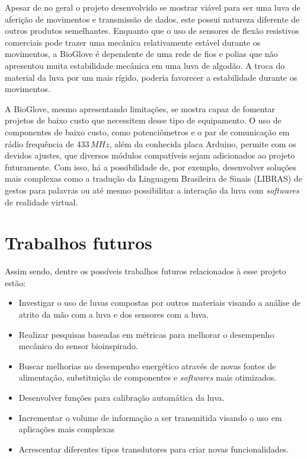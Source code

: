 \documentclass[
	12pt,				%
	openright,			%
	oneside,			%
	a4paper,			%
	english,			%
	brazil				%
	]{abntex2}
\begin{document}
		Apesar de no geral o projeto desenvolvido se mostrar viável para ser uma luva de aferição de movimentos e transmissão de dados, este possui natureza diferente de outros produtos semelhantes. Enquanto que o uso de sensores de flexão resistivos comerciais pode trazer uma mecânica relativamente estável durante os movimentos, a BioGlove é dependente de uma rede de fios e polias que não apresentou muita estabilidade mecânica em uma luva de algodão. A troca do material da luva por um  mais rígido, poderia favorecer a estabilidade durante os movimentos.

		A BioGlove, mesmo apresentando limitações, se mostra capaz de fomentar projetos de baixo custo que necessitem desse tipo de equipamento. O uso de componentes de baixo custo, como potenciômetros e o par de comunicação em rádio frequência de 433$\,MHz$, além da conhecida placa Arduino, permite com os devidos ajustes, que diversos módulos compatíveis sejam adicionados ao projeto futuramente. Com isso, há a possibilidade de, por exemplo, desenvolver soluções mais complexas como a tradução da Linguagem Brasileira de Sinais (LIBRAS) de gestos para palavras ou até mesmo possibilitar a interação da luva com \textit{softwares} de realidade virtual.

			\section{Trabalhos futuros}		

		Assim sendo, dentre os possíveis trabalhos futuros relacionados à esse projeto estão:

		\begin{itemize}
			\item Investigar o uso de luvas compostas por outros materiais visando a análise de atrito da mão com a luva e dos sensores com a luva.
			\item Realizar pesquisas baseadas em métricas para melhorar o desempenho mecânico do sensor bioinspirado.
			\item Buscar melhorias no desempenho energético através de novas fontes de alimentação, substituição de componentes e \textit{softwares} mais otimizados.
			\item Desenvolver funções para calibração automática da luva.
			\item Incrementar o volume de informação a ser transmitida visando o uso em aplicações mais complexas
			\item Acrescentar diferentes tipos transdutores para criar novas funcionalidades.
		\end{itemize}

		
\postextual



\printindex
\end{document}
